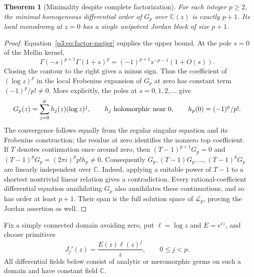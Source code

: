 \documentclass[11pt,a4paper]{article}
\newtheorem{theorem}{Theorem}[section]
\theoremstyle{definition}
\theoremstyle{remark}
\numberwithin{equation}{section}
\begin{document}
\begin{theorem}[Minimality despite complete factorization]
\label{p3:thm:meijer-minimal}
For each integer $p\ge2$, the minimal homogeneous differential order of
$G_p$ over $\mathbb C(z)$ is exactly $p+1$.  Its local monodromy at $z=0$
has a single unipotent Jordan block of size $p+1$.
\end{theorem}
\begin{proof}
Equation~\eqref{p3:eq:factor-meijer} supplies the upper bound.  At the pole
$s=0$ of the Mellin kernel,
\[
 \Gamma(-s)^{p+1}\Gamma(1+s)^p
     =(-1)^{p+1}s^{-p-1}(1+O(s)).
\]
Closing the contour to the right gives a minus sign.  Thus the coefficient
of $(\log z)^p$ in the local Frobenius expansion of $G_p$ at zero has
constant term $(-1)^p/p!\ne0$.  More explicitly, the poles at
$s=0,1,2,\ldots$ give
\[
 G_p(z)=\sum_{j=0}^{p} h_j(z)(\log z)^j,
 \qquad h_j\ \hbox{holomorphic near }0,
 \qquad h_p(0)=(-1)^p/p!.
\]
The convergence follows equally from the regular singular equation and
its Frobenius construction; the residue at zero identifies the nonzero
top coefficient.  If $T$ denotes continuation once around zero, then
$(T-1)^{p+1}G_p=0$ and
$(T-1)^pG_p=(2\pi i)^p p!h_p\ne0$.
Consequently $G_p,(T-1)G_p,\ldots,(T-1)^pG_p$ are linearly independent
over $\mathbb C$.  Indeed, applying a suitable power of $T-1$ to a
shortest nontrivial linear relation gives a contradiction.  Every
rational-coefficient differential equation annihilating $G_p$ also
annihilates these continuations, and so has order at least $p+1$.
Their span is the full solution space of $\mathcal L_p$, proving the
Jordan assertion as well.
\end{proof}

Fix a simply connected domain avoiding zero, put $\ell=\log z$ and
$E=e^{\epsilon z}$, and choose primitives
\begin{equation}\label{p3:eq:J-primitives}
 J_j'(z)=\frac{E(z)\ell(z)^j}{z},\qquad 0\le j<p.
\end{equation}
All differential fields below consist of analytic or meromorphic germs
on such a domain and have constant field $\mathbb C$.
\end{document}
